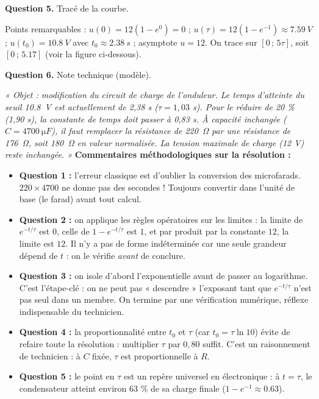 \documentclass[11pt]{article}
\begin{document}
\begin{exoresolu}
\medskip
\textbf{Question 5.} Tracé de la courbe.

Points remarquables : $u(0) = 12(1 - e^0) = 0$ ; $u(\tau) = 12(1 - e^{-1}) \approx \SI{7,59}{V}$ ; $u(t_0) = \SI{10,8}{V}$ avec $t_0 \approx \SI{2,38}{s}$ ; asymptote $u = 12$. On trace sur $[0\,;\,5\tau]$, soit $[0\,;\,\num{5,17}]$ (voir la figure ci-dessous).

\medskip
\textbf{Question 6.} Note technique (modèle).

\emph{« Objet : modification du circuit de charge de l'onduleur. Le temps d'atteinte du seuil \SI{10,8}{V} est actuellement de 2,38 s ($\tau = 1,03$ s). Pour le réduire de 20 \% (1,90 s), la constante de temps doit passer à 0,83 s. À capacité inchangée ($C = \SI{4700}{\micro F}$), il faut remplacer la résistance de \SI{220}{\ohm} par une résistance de \SI{176}{\ohm}, soit \SI{180}{\ohm} en valeur normalisée. La tension maximale de charge (12 V) reste inchangée. »}
\tcblower
\textbf{Commentaires méthodologiques sur la résolution :}
\begin{itemize}
\item \textbf{Question 1 :} l'erreur classique est d'oublier la conversion des microfarads. $220 \times 4700$ ne donne pas des secondes ! Toujours convertir dans l'unité de base (le farad) avant tout calcul.
\item \textbf{Question 2 :} on applique les règles opératoires sur les limites : la limite de $e^{-t/\tau}$ est $0$, celle de $1 - e^{-t/\tau}$ est $1$, et par produit par la constante $12$, la limite est $12$. Il n'y a pas de forme indéterminée car une seule grandeur dépend de $t$ : on le vérifie \emph{avant} de conclure.
\item \textbf{Question 3 :} on isole d'abord l'exponentielle avant de passer au logarithme. C'est l'étape-clé : on ne peut pas « descendre » l'exposant tant que $e^{-t/\tau}$ n'est pas seul dans un membre. On termine par une vérification numérique, réflexe indispensable du technicien.
\item \textbf{Question 4 :} la proportionnalité entre $t_0$ et $\tau$ (car $t_0 = \tau \ln 10$) évite de refaire toute la résolution : multiplier $\tau$ par $0,80$ suffit. C'est un raisonnement de technicien : à $C$ fixée, $\tau$ est proportionnelle à $R$.
\item \textbf{Question 5 :} le point en $\tau$ est un repère universel en électronique : à $t = \tau$, le condensateur atteint environ 63 \% de sa charge finale ($1 - e^{-1} \approx \num{0,63}$).
\end{itemize}
\end{exoresolu}
\end{document}
